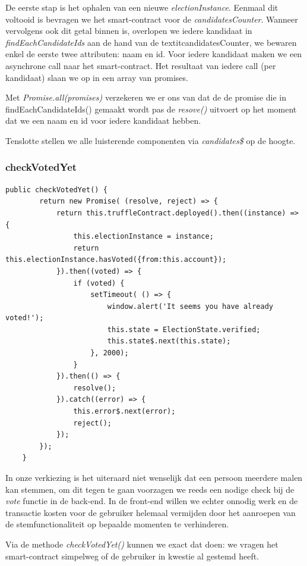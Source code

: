 		De eerste stap is het ophalen van een nieuwe \textit{electionInstance}. Eenmaal dit voltooid is bevragen we het smart-contract voor de \textit{candidatesCounter}. Wanneer vervolgens ook dit getal binnen is, overlopen we iedere kandidaat in \textit{findEachCandidateIds} aan de hand van de textit{candidatesCounter}, we bewaren enkel de eerste twee attributen:  naam en id. Voor iedere kandidaat maken we een asynchrone call naar het smart-contract. Het resultaat van iedere call (per kandidaat) slaan we op in een array van promises.
		
		Met \textit{Promise.all(promises)} verzekeren we er ons van dat de de promise die in findEachCandidateIds() gemaakt wordt pas de \textit{resove()} uitvoert op het moment dat we een naam en id voor iedere kandidaat hebben.
		
		Tenslotte stellen we alle luisterende componenten via \textit{candidates\$} op de hoogte. 
	\subsubsection{checkVotedYet}
	\lstset{language=JavaScriptSolidity} 
	\begin{lstlisting}[numbers=none]
	public checkVotedYet() {
		return new Promise( (resolve, reject) => {
			return this.truffleContract.deployed().then((instance) => {
				this.electionInstance = instance;
				return this.electionInstance.hasVoted({from:this.account});
			}).then((voted) => {
				if (voted) {
					setTimeout( () => {
						window.alert('It seems you have already voted!');
						this.state = ElectionState.verified;
						this.state$.next(this.state);
					}, 2000);
				}
			}).then(() => {
				resolve();
			}).catch((error) => {
				this.error$.next(error);
				reject();
			});
		});
	}
	\end{lstlisting}
	In onze verkiezing is het uiteraard niet wenselijk dat een persoon meerdere malen kan stemmen, om dit tegen te gaan voorzagen we reeds een nodige check bij de \textit{vote} functie in de back-end. In de front-end willen we echter onnodig werk en de transactie kosten voor de gebruiker helemaal vermijden door het aanroepen van de stemfunctionaliteit op bepaalde momenten te verhinderen. 
	
	Via de methode \textit{checkVotedYet()} kunnen we exact dat doen: we vragen het smart-contract simpelweg of de gebruiker in kwestie al gestemd heeft.

